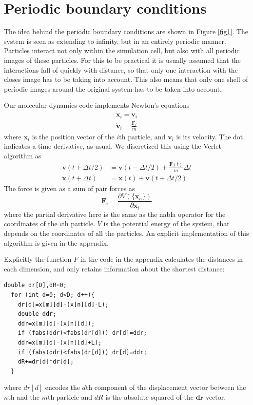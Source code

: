 \documentclass{article}
\begin{document}
\section{Periodic boundary conditions}
The idea behind the periodic boundary conditions are shown in Figure \ref{fig1}. The system is seen as extending to infinity, but in an entirely periodic manner. Particles interact not only within the simulation cell, but also with all periodic images of these particles. For this to be practical it is usually assumed that the interactions fall of quickly with distance, so that only one interaction with the closes image has to be taking into account. This also means that only one shell of periodic images around the original system has to be taken into account.

Our molecular dynamics code implements Newton's equations
\begin{align}
  \dot{\mathbf{x}}_i = \mathbf{v}_i\\
  \dot{\mathbf{v}}_i = \frac{\mathbf{F}_i}{m}
\end{align}
where $\mathbf{x}_i$ is the position vector of the $i$th particle, and $\mathbf{v}_i$ is its velocity. The dot indicates a time derivative, as usual. We discretized this using the Verlet algorithm as
\begin{align}
  \mathbf{v}(t+\Delta t/2)&=\mathbf{v}(t-\Delta t/2) +\frac{\mathbf{F}(t)}{m}\Delta t\\
  \mathbf{x}(t+\Delta t) &= \mathbf{x}(t)+ \mathbf{v}(t+\Delta t/2)
\end{align}
The force is given as a sum of pair forces as
\begin{equation}
  \mathbf{F}_i = \frac{\partial V(\{\mathbf{x}_n\})}{\partial \mathbf{x}_i}
\end{equation}
where the partial derivative here is the same as the nabla operator for the coordinates of the $i$th particle. $V$ is the potential energy of the system, that depends on the coordinates of all the particles. An explicit implementation of this algorithm is given in the appendix. 

Explicitly the function $F$ in the code in the appendix calculates the distances in each dimension, and only retains information about the shortest distance:

\begin{lstlisting}[frame=single]
  double dr[D],dR=0;
  for (int d=0; d<D; d++){
    dr[d]=x[m][d]-(x[n][d]-L);
    double ddr;
    ddr=x[m][d]-(x[n][d]);
    if (fabs(ddr)<fabs(dr[d])) dr[d]=ddr;
    ddr=x[m][d]-(x[n][d]+L);
    if (fabs(ddr)<fabs(dr[d])) dr[d]=ddr;
    dR+=dr[d]*dr[d];
  }
\end{lstlisting}
where $dr[d]$ encodes the $d$th component of the displacement vector between the $n$th and the $m$th particle and $dR$ is the absolute squared of the $\mathbf{dr}$ vector. 
\end{document}
